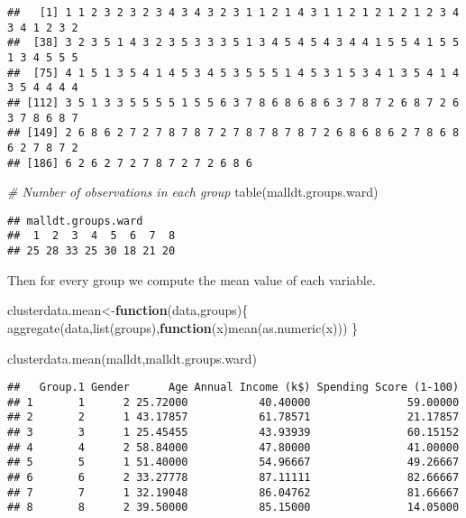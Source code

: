 \documentclass[
]{article}
\newenvironment{Shaded}{\begin{snugshade}}{\end{snugshade}}
\newcommand{\CommentTok}[1]{\textcolor[rgb]{0.56,0.35,0.01}{\textit{#1}}}
\newcommand{\ControlFlowTok}[1]{\textcolor[rgb]{0.13,0.29,0.53}{\textbf{#1}}}
\newcommand{\FunctionTok}[1]{\textcolor[rgb]{0.00,0.00,0.00}{#1}}
\newcommand{\NormalTok}[1]{#1}
\newcommand{\OtherTok}[1]{\textcolor[rgb]{0.56,0.35,0.01}{#1}}
\begin{document}
\begin{verbatim}
##   [1] 1 1 2 3 2 3 2 3 4 3 4 3 2 3 1 1 2 1 4 3 1 1 2 1 2 1 2 1 2 3 4 3 4 1 2 3 2
##  [38] 3 2 3 5 1 4 3 2 3 5 3 3 3 5 1 3 4 5 4 5 4 3 4 4 1 5 5 4 1 5 5 1 3 4 5 5 5
##  [75] 4 1 5 1 3 5 4 1 4 5 3 4 5 3 5 5 5 1 4 5 3 1 5 3 4 1 3 5 4 1 4 3 5 4 4 4 4
## [112] 3 5 1 3 3 5 5 5 5 1 5 5 6 3 7 8 6 8 6 8 6 3 7 8 7 2 6 8 7 2 6 3 7 8 6 8 7
## [149] 2 6 8 6 2 7 2 7 8 7 8 7 2 7 8 7 8 7 8 7 2 6 8 6 8 6 2 7 8 6 8 6 2 7 8 7 2
## [186] 6 2 6 2 7 2 7 8 7 2 7 2 6 8 6
\end{verbatim}

\begin{Shaded}
\begin{Highlighting}[]
\CommentTok{\# Number of observations in each group}
\FunctionTok{table}\NormalTok{(malldt.groups.ward)}
\end{Highlighting}
\end{Shaded}

\begin{verbatim}
## malldt.groups.ward
##  1  2  3  4  5  6  7  8 
## 25 28 33 25 30 18 21 20
\end{verbatim}

Then for every group we compute the mean value of each variable.

\begin{Shaded}
\begin{Highlighting}[]
\NormalTok{clusterdata.mean}\OtherTok{\textless{}{-}}\ControlFlowTok{function}\NormalTok{(data,groups)\{}
  \FunctionTok{aggregate}\NormalTok{(data,}\FunctionTok{list}\NormalTok{(groups),}\ControlFlowTok{function}\NormalTok{(x)}\FunctionTok{mean}\NormalTok{(}\FunctionTok{as.numeric}\NormalTok{(x)))}
\NormalTok{\}}

\FunctionTok{clusterdata.mean}\NormalTok{(malldt,malldt.groups.ward)}
\end{Highlighting}
\end{Shaded}

\begin{verbatim}
##   Group.1 Gender      Age Annual Income (k$) Spending Score (1-100)
## 1       1      2 25.72000           40.40000               59.00000
## 2       2      1 43.17857           61.78571               21.17857
## 3       3      1 25.45455           43.93939               60.15152
## 4       4      2 58.84000           47.80000               41.00000
## 5       5      1 51.40000           54.96667               49.26667
## 6       6      2 33.27778           87.11111               82.66667
## 7       7      1 32.19048           86.04762               81.66667
## 8       8      2 39.50000           85.15000               14.05000
\end{verbatim}
\end{document}
